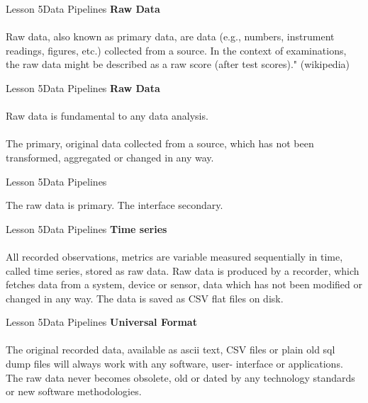 \documentclass[aspectratio=1610]{beamer}
\begin{document}
\begin{frame}{Lesson 5}{Data Pipelines}
\LARGE
\textbf{Raw Data}\\~\\
Raw data, also known as primary data, are data (e.g., numbers, 
instrument readings, figures, etc.) collected from a source. In the 
context of examinations, the raw data might be described as a raw 
score (after test scores)." (wikipedia)
\end{frame}



\begin{frame}{Lesson 5}{Data Pipelines}
\LARGE
\textbf{Raw Data}\\~\\
Raw data is fundamental to any data analysis.\\~\\
The primary, original data collected from a source, which has not
been transformed, aggregated or changed in any way.
\end{frame}



\begin{frame}{Lesson 5}{Data Pipelines}
\Huge
\begin{center}
The raw data is primary. The interface secondary.
\end{center}
\end{frame}



\begin{frame}{Lesson 5}{Data Pipelines}
\LARGE
\textbf{Time series}\\~\\
All recorded observations, metrics are variable measured
sequentially in time, called time series, stored as raw data. Raw
data is produced by a recorder, which fetches data from a system,
device or sensor, data which has not been modified or changed in any
way. The data is saved as CSV flat files on disk.
\end{frame}



\begin{frame}{Lesson 5}{Data Pipelines}
\LARGE
\textbf{Universal Format}\\~\\
The original recorded data, available as ascii text, CSV files or 
plain old sql dump files will always work with any software, user-
interface or applications. The raw data never becomes obsolete, old 
or dated by any technology standards or new software methodologies.
\end{frame}
\end{document}
